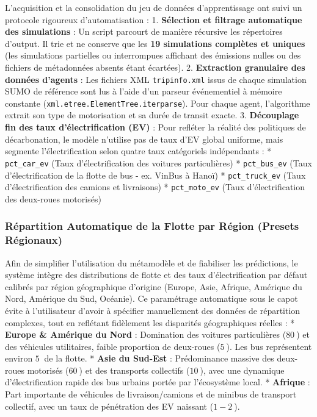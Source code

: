 \documentclass[10pt, a4paper]{article}
\begin{document}
L'acquisition et la consolidation du jeu de données d'apprentissage ont
suivi un protocole rigoureux d'automatisation : 1. \textbf{Sélection et
filtrage automatique des simulations} : Un script parcourt de manière
récursive les répertoires d'output. Il trie et ne conserve que les
\textbf{19 simulations complètes et uniques} (les simulations partielles
ou interrompues affichant des émissions nulles ou des fichiers de
métadonnées absents étant écartées). 2. \textbf{Extraction granulaire
des données d'agents} : Les fichiers XML \texttt{tripinfo.xml} issus de
chaque simulation SUMO de référence sont lus à l'aide d'un parseur
événementiel à mémoire constante
(\texttt{xml.etree.ElementTree.iterparse}). Pour chaque agent,
l'algorithme extrait son type de motorisation et sa durée de transit
exacte. 3. \textbf{Découplage fin des taux d'électrification (EV)} :
Pour refléter la réalité des politiques de décarbonation, le modèle
n'utilise pas de taux d'EV global uniforme, mais segmente
l'électrification selon quatre taux catégoriels indépendants : *
\texttt{pct\_car\_ev} (Taux d'électrification des voitures
particulières) * \texttt{pct\_bus\_ev} (Taux d'électrification de la
flotte de bus - ex. VinBus à Hanoï) * \texttt{pct\_truck\_ev} (Taux
d'électrification des camions et livraisons) * \texttt{pct\_moto\_ev}
(Taux d'électrification des deux-roues motorisés)

\subsubsection{Répartition Automatique de la Flotte par Région (Presets
Régionaux)}\label{ruxe9partition-automatique-de-la-flotte-par-ruxe9gion-presets-ruxe9gionaux}

Afin de simplifier l'utilisation du métamodèle et de fiabiliser les
prédictions, le système intègre des distributions de flotte et des taux
d'électrification par défaut calibrés par région géographique d'origine
(Europe, Asie, Afrique, Amérique du Nord, Amérique du Sud, Océanie). Ce
paramétrage automatique sous le capot évite à l'utilisateur d'avoir à
spécifier manuellement des données de répartition complexes, tout en
reflétant fidèlement les disparités géographiques réelles : *
\textbf{Europe \& Amérique du Nord} : Domination des voitures
particulières (\(80\ %
\)) et des véhicules utilitaires, faible proportion de deux-roues
(\(5\ %
\)). Les bus représentent environ \(5\ %
\) de la flotte. * \textbf{Asie du Sud-Est} : Prédominance massive des
deux-roues motorisés (\(60\ %
\)) et des transports collectifs (\(10\ %
\)), avec une dynamique d'électrification rapide des bus urbains portée
par l'écosystème local. * \textbf{Afrique} : Part importante de
véhicules de livraison/camions et de minibus de transport collectif,
avec un taux de pénétration des EV naissant (\(1-2\ %
\)).
\end{document}
